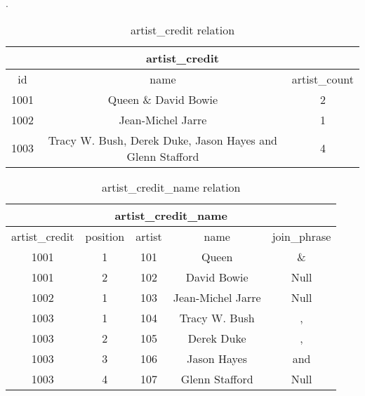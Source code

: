 \documentclass{article}
\begin{document}
. \par
\begin{table}[h]
\centering
\caption{artist\_credit relation}
\label{my-label}
\begin{tabular}{|c|c|c|}
\hline
\multicolumn{3}{|c|}{artist\_credit}                                             \\ \hline
id   & name                                                      & artist\_count \\ \hline
1001 & Queen \& David Bowie                                      & 2             \\ \hline
1002 & Jean-Michel Jarre                                         & 1             \\ \hline
1003 & Tracy W. Bush, Derek Duke, Jason Hayes and Glenn Stafford & 4             \\ \hline
\end{tabular}
\end{table}

\par

\begin{table}[h]
\centering
\caption{artist\_credit\_name relation}
\label{my-label}
\begin{tabular}{|c|c|c|c|c|}
\hline
\multicolumn{5}{|c|}{artist\_credit\_name}                            \\ \hline
artist\_credit & position & artist & name              & join\_phrase \\ \hline
1001           & 1        & 101    & Queen             & \&           \\ \hline
1001           & 2        & 102    & David Bowie       & Null         \\ \hline
1002           & 1        & 103    & Jean-Michel Jarre & Null         \\ \hline
1003           & 1        & 104    & Tracy W. Bush     & ,            \\ \hline
1003           & 2        & 105    & Derek Duke        & ,            \\ \hline
1003           & 3        & 106    & Jason Hayes       & and          \\ \hline
1003           & 4        & 107    & Glenn Stafford    & Null         \\ \hline
\end{tabular}
\end{table}
\end{document}
